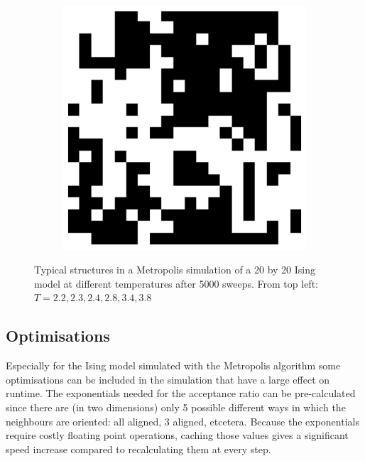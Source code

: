 \documentclass[11pt, a4paper]{report} %
\begin{document}
\begin{figure}[htb]
\begin{subfigure}[c]{0.2\linewidth}
	\end{subfigure}
	~
	\begin{subfigure}[c]{0.2\linewidth}
		\includegraphics[width=\linewidth]{20_by_20_Lattice_step5000_T=38.pdf}
	\end{subfigure}

	\caption{Typical structures in a Metropolis simulation of a 20 by 20 Ising model at different temperatures after 5000 sweeps. From top left: \(T=2.2,2.3,2.4,2.8,3.4,3.8\)}
	\label{fig:metropolis_ising_at_temps}
\end{figure}

\subsection{Optimisations}
Especially for the Ising model simulated with the Metropolis algorithm some optimisations can be included in the simulation that have a large effect on runtime.
The exponentials needed for the acceptance ratio can be pre-calculated since there are (in two dimensions) only 5 possible different ways in which the neighbours are oriented:
all aligned, 3 aligned, etcetera.
Because the exponentials require costly floating point operations, caching those values gives a significant speed increase compared to recalculating them at every step.
\end{document}
